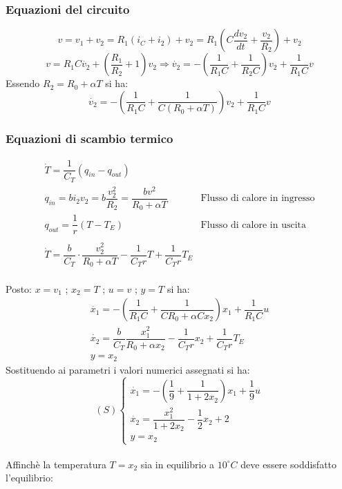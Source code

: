 \documentclass[a4paper]{report}
\begin{document}
\subsubsection{Equazioni del circuito}
\[
v = v_1 + v_2 = R_1(i_C + i_2) + v_2 = R_1 \left(C \frac{dv_2}{dt} +
\frac{v_2}{R_2}\right) + v_2
\]
\[
  v = R_1C\dot{v_2} + \left( \frac{R_1}{R_2} + 1\right)v_2 \Rightarrow
  \dot{v_2} = - \left( \frac{1}{R_1C} + \frac{1}{R_2C}\right)v_2 + \frac{1}{R_1C}v
\]
Essendo $R_2 = R_0 + \alpha T$ si ha:
\[
  \dot{v_2} = - \left( \frac{1}{R_1C} + \frac{1}{C(R_0 + \alpha T)}\right)v_2 + \frac{1}{R_1C}v
\]

\subsubsection{Equazioni di scambio termico}
\[
  \begin{array}{ll}
    \dot{T} = \dfrac{1}{C_T} (q_{in} - q_{out}) &  \\
    q_{in} = b i_2 v_2 = b \dfrac{v_2^2}{R_2} = \dfrac{b v^2}{R_0 +
      \alpha T} & \textrm{Flusso di calore in ingresso}\\
    q_{out} = \dfrac{1}{r}(T - T_E) & \textrm{Flusso di calore in
      uscita}\\
     & \\
    \dot{T} = \dfrac{b}{C_T} \cdot \dfrac{v_2^2}{R_0 + \alpha T} -
    \dfrac{1}{C_T r}T + \dfrac{1}{C_T r}T_E & 
  \end{array}
\]
\\
Posto: $x = v_1$ ; $x_2 = T$ ; $u = v$ ; $y = T$ si ha:
\[
  \begin{array}{l}
    \dot{x_1} = - \left( \dfrac{1}{R_1C} + \dfrac{1}{C R_0 + \alpha C
      x_2}\right)x_1 + \dfrac{1}{R_1 C}u\\
    \dot{x_2} = \dfrac{b}{C_T} \dfrac{x_1^2}{R_0 + \alpha x_2} -
    \dfrac{1}{C_T r}x_2 + \dfrac{1}{C_T r}T_E\\
    y = x_2
  \end{array}
\]
Sostituendo ai parametri i valori numerici assegnati si ha:
\[
  (S)
  \left\{
  \begin{array}{l}
    \dot{x_1} = - \left( \dfrac{1}{9} + \dfrac{1}{1 + 2x_2}\right)x_1 + \dfrac{1}{9}u\\
    \dot{x_2} = \dfrac{x_1^2}{1 + 2x_2} - \dfrac{1}{2}x_2 + 2\\
    y = x_2
  \end{array}
  \right .
\]
\\
Affinch\`e la temperatura $T = x_2$ sia in equilibrio a $10 ^{\circ}C$
deve essere soddisfatto l'equilibrio:
\end{document}
